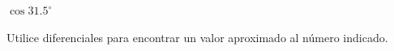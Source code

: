 \item $\cos 31.5^\circ$
\par
Utilice diferenciales para encontrar un valor aproximado al número indicado.
